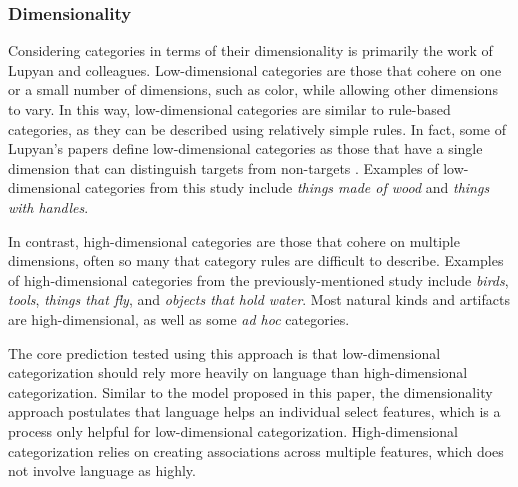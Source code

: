 \documentclass[../dissertation.tex]{subfiles}
\begin{document}
\subsubsection{Dimensionality}

Considering categories in terms of their dimensionality is primarily the work of Lupyan and colleagues. Low-dimensional categories are those that cohere on one or a small number of dimensions, such as color, while allowing other dimensions to vary. In this way, low-dimensional categories are similar to rule-based categories, as they can be described using relatively simple rules. In fact, some of Lupyan's papers define low-dimensional categories as those that have a single dimension that can distinguish targets from non-targets \citep{Lupyan2013}. Examples of low-dimensional categories from this study include \textit{things made of wood} and \textit{things with handles}. \par
	In contrast, high-dimensional categories are those that cohere on multiple dimensions, often so many that category rules are difficult to describe. Examples of high-dimensional categories from the previously-mentioned study include \textit{birds}, \textit{tools}, \textit{things that fly}, and \textit{objects that hold water}. Most natural kinds and artifacts are high-dimensional, as well as some \textit{ad hoc} categories. \par
	The core prediction tested using this approach is that low-dimensional categorization should rely more heavily on language than high-dimensional categorization. Similar to the model proposed in this paper, the dimensionality approach postulates that language helps an individual select features, which is a process only helpful for low-dimensional categorization. High-dimensional categorization relies on creating associations across multiple features, which does not involve language as highly. \par 
\end{document}
